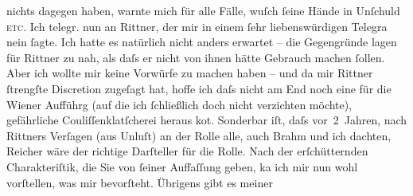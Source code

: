 \begin{ledgroupsized}[t]{13cm}
               nichts dagegen haben, warnte mich für alle Fälle, wuſch ſeine Hände in Unſchuld \textsc{etc.} Ich telegr. nun an Rittner, der mir in einem ſehr liebenswürdigen Telegra{\geminationm} nein ſagte. Ich hatte es natürlich nicht anders
               erwartet – die Gegengründe lagen für Rittner
               zu nah, als daſs er nicht von ihnen hätte {\pb}Gebrauch machen ſollen. Aber ich wollte mir keine Vorwürfe zu machen haben – und da
               mir Rittner ſtrengſte Discretion zugeſagt hat,
               hoffe ich daſs nicht am End noch eine für die Wiener Aufführg (auf die ich ſchließlich doch nicht verzichten möchte),
               gefährliche Couliſſenklatſcherei heraus ko{\geminationm}t. Sonderbar
               iſt, daſs vor 2 Jahren, nach Rittners Verſagen
               (aus Unluſt) an der Rolle alle, auch Brahm und
               ich dachten, Reicher wäre der richtige
               Darſteller für die Rolle. Nach der erſchütternden Charakteriſtik, die Sie von ſeiner
               Auffaſſung geben, ka{\geminationn} ich mir nun wohl vorſtellen, was
               mir {\pb}bevorſteht. Übrigens gibt es meiner

\end{ledgroupsized}
